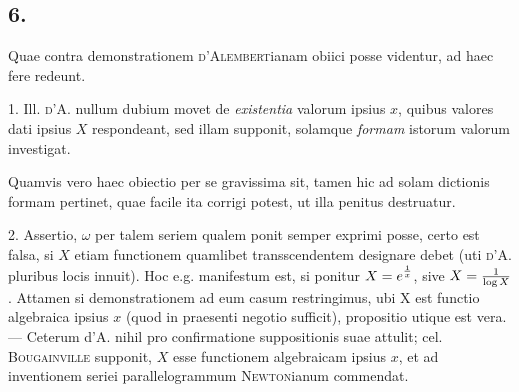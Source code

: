 \documentclass[twoside,12pt, showframe]{memoir}
\let\oldfrac\frac
\def\frac#1#2{\mathchoice{\tfrac{#1}{#2}}{\oldfrac{#1}{#2}}{\genfrac{}{}{}{2}{#1}{#2\mathstrut}}{\genfrac{}{}{}{3}{#1}{#2\mathstrut}}}
\begin{document}
\subsection*{6.}

Quae contra demonstrationem \textsc{d'Alembert}ianam obiici posse videntur, ad haec fere redeunt.

1. Ill. \textsc{d'A}. nullum dubium movet de \textit{existentia} valorum ipsius \(x\), quibus valores dati ipsius \(X\) respondeant, sed illam supponit, solamque \textit{formam} istorum valorum investigat.

Quamvis vero haec obiectio per se gravissima sit, tamen hic ad solam dictionis formam pertinet, quae facile ita corrigi potest, ut illa penitus destruatur.

2. Assertio, \(\omega\) per talem seriem qualem ponit semper exprimi posse, certo est falsa, si \(X\) etiam functionem quamlibet transscendentem designare debet (uti \textsc{d'A.} pluribus locis innuit). Hoc e.g. manifestum est, si ponitur \(X = e^{\frac{1}{x}}\), sive \(X = \frac{1}{\log X}\). Attamen si demonstrationem ad eum casum restringimus, ubi X est functio algebraica ipsius \(x\) (quod in praesenti negotio sufficit), propositio utique est vera. — Ceterum d'A. nihil pro confirmatione suppositionis suae attulit; cel. \textsc{Bougainville} supponit, \(X\) esse functionem algebraicam ipsius \(x\), et ad inventionem seriei parallelogrammum \textsc{Newton}ianum commendat.
\end{document}
